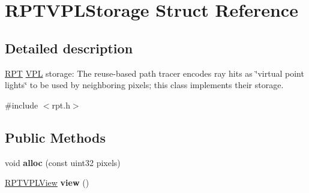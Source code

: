 \hypertarget{struct_r_p_t_v_p_l_storage}{}\section{R\+P\+T\+V\+P\+L\+Storage Struct Reference}
\label{struct_r_p_t_v_p_l_storage}


\subsection{Detailed description}
\hyperlink{struct_r_p_t}{R\+PT} \hyperlink{struct_v_p_l}{V\+PL} storage\+: The reuse-\/based path tracer encodes ray hits as \char`\"{}virtual point lights\char`\"{} to be used by neighboring pixels; this class implements their storage. 

{\ttfamily \#include $<$rpt.\+h$>$}

\subsection*{Public Methods}
\begin{DoxyCompactItemize}
\item 
\mbox{\label{struct_r_p_t_v_p_l_storage_a017acca5f0875803911bc99799ddc429}} 
void {\bfseries alloc} (const uint32 pixels)
\item 
\mbox{\label{struct_r_p_t_v_p_l_storage_ab9155a06eae5903867d4ebc91190345a}} 
\hyperlink{struct_r_p_t_v_p_l_view}{R\+P\+T\+V\+P\+L\+View} {\bfseries view} ()
\end{DoxyCompactItemize}
